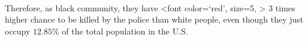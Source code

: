 \documentclass[11pt]{article}
\begin{document}
    \begin{center}
    \end{center}
    { \hspace*{\fill} \\}
    
    Therefore, as black community, they have \textless font color=`red',
size=5, \textgreater{} 3 times higher chance to be killed by the police
than white people, even though they just occupy \(12.85\%\) of the total
population in the U.S.


    
    
    
    
\end{document}
